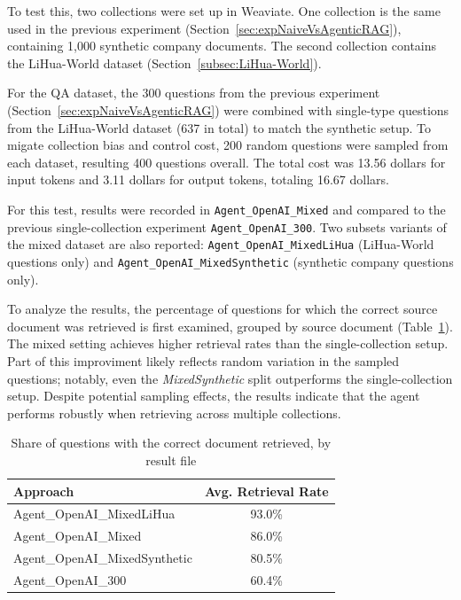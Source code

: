 To test this, two collections were set up in Weaviate. One collection is the same used in the previous experiment (Section~\ref{sec:expNaiveVsAgenticRAG}), containing 1,000 synthetic company documents. The second collection contains the LiHua-World dataset (Section~\ref{subsec:LiHua-World}).

For the \gls{QA} dataset, the 300 questions from the previous experiment (Section~\ref{sec:expNaiveVsAgenticRAG}) were combined with single-type questions from the LiHua-World dataset (637 in total) to match the synthetic setup. To migate collection bias and control cost, 200 random questions were sampled from each dataset, resulting 400 questions overall. The total cost was 13.56 dollars for input tokens and 3.11 dollars for output tokens, totaling 16.67 dollars.

For this test, results were recorded in \texttt{Agent\_OpenAI\_Mixed} and compared to the previous single-collection experiment \texttt{Agent\_OpenAI\_300}. Two subsets variants of the mixed dataset are also reported: \texttt{Agent\_OpenAI\_MixedLiHua} (LiHua-World questions only) and \texttt{Agent\_OpenAI\_MixedSynthetic} (synthetic company questions only).

To analyze the results, the percentage of questions for which the correct source document was retrieved is first examined, grouped by source document (Table~\ref{tab:doc-retrieved-by-source-mixed}). The mixed setting achieves higher retrieval rates than the single-collection setup. Part of this improviment likely reflects random variation in the sampled questions; notably, even the \emph{MixedSynthetic} split outperforms the single-collection setup. Despite potential sampling effects, the results indicate that the agent performs robustly when retrieving across multiple collections.
\begin{table}[htbp]
    \centering
    \begin{tabular}{l c}
        \hline
        Approach & Avg. Retrieval Rate \\
        \hline
    Agent\_OpenAI\_MixedLiHua & 93.0\% \\
    Agent\_OpenAI\_Mixed & 86.0\% \\
    Agent\_OpenAI\_MixedSynthetic & 80.5\% \\
    Agent\_OpenAI\_300 & 60.4\% \\
        \hline
    \end{tabular}
    \caption{Share of questions with the correct document retrieved, by result file}\label{tab:doc-retrieved-by-source-mixed}
\end{table}

